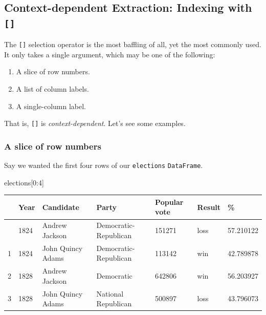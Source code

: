 \documentclass[
  letterpaper,
  DIV=11,
  numbers=noendperiod]{scrreprt}
\newenvironment{Shaded}{\begin{snugshade}}{\end{snugshade}}
\newcommand{\DecValTok}[1]{\textcolor[rgb]{0.68,0.00,0.00}{#1}}
\newcommand{\NormalTok}[1]{\textcolor[rgb]{0.00,0.23,0.31}{#1}}
\providecommand{\tightlist}{%
  \setlength{\itemsep}{0pt}\setlength{\parskip}{0pt}}\usepackage{longtable,booktabs,array}
\begin{document}
\subsection{\texorpdfstring{Context-dependent Extraction: Indexing with
\texttt{{[}{]}}}{Context-dependent Extraction: Indexing with {[}{]}}}\label{context-dependent-extraction-indexing-with}

The \texttt{{[}{]}} selection operator is the most baffling of all, yet
the most commonly used. It only takes a single argument, which may be
one of the following:

\begin{enumerate}
\def\labelenumi{\arabic{enumi}.}
\tightlist
\item
  A slice of row numbers.
\item
  A list of column labels.
\item
  A single-column label.
\end{enumerate}

That is, \texttt{{[}{]}} is \emph{context-dependent}. Let's see some
examples.

\subsubsection{A slice of row numbers}\label{a-slice-of-row-numbers}

Say we wanted the first four rows of our \texttt{elections}
\texttt{DataFrame}.

\begin{Shaded}
\begin{Highlighting}[]
\NormalTok{elections[}\DecValTok{0}\NormalTok{:}\DecValTok{4}\NormalTok{]}
\end{Highlighting}
\end{Shaded}

\begin{longtable}[]{@{}lllllll@{}}
\toprule\noalign{}
& Year & Candidate & Party & Popular vote & Result & \% \\
\midrule\noalign{}
\endhead
\bottomrule\noalign{}
\endlastfoot
0 & 1824 & Andrew Jackson & Democratic-Republican & 151271 & loss &
57.210122 \\
1 & 1824 & John Quincy Adams & Democratic-Republican & 113142 & win &
42.789878 \\
2 & 1828 & Andrew Jackson & Democratic & 642806 & win & 56.203927 \\
3 & 1828 & John Quincy Adams & National Republican & 500897 & loss &
43.796073 \\
\end{longtable}
\end{document}
